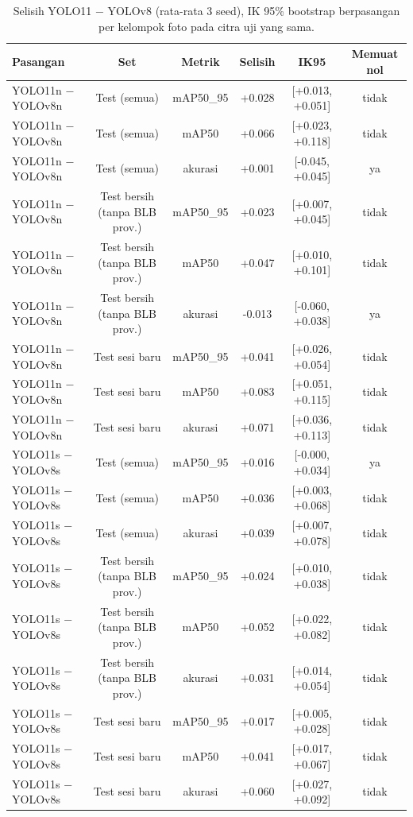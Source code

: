 \begin{table}[!t]
\centering
\caption{Selisih YOLO11 − YOLOv8 (rata-rata 3 seed), IK 95\% bootstrap berpasangan per kelompok foto pada citra uji yang sama.}
\label{tab:v8_vs_v11}
\footnotesize
\begin{tabular}{lccccc}
\hline
\textbf{Pasangan} & \textbf{Set} & \textbf{Metrik} & \textbf{Selisih} & \textbf{IK95} & \textbf{Memuat nol} \\
\hline
YOLO11n − YOLOv8n & Test (semua) & mAP50\_95 & +0.028 & [+0.013, +0.051] & tidak \\
YOLO11n − YOLOv8n & Test (semua) & mAP50 & +0.066 & [+0.023, +0.118] & tidak \\
YOLO11n − YOLOv8n & Test (semua) & akurasi & +0.001 & [-0.045, +0.045] & ya \\
YOLO11n − YOLOv8n & Test bersih (tanpa BLB prov.) & mAP50\_95 & +0.023 & [+0.007, +0.045] & tidak \\
YOLO11n − YOLOv8n & Test bersih (tanpa BLB prov.) & mAP50 & +0.047 & [+0.010, +0.101] & tidak \\
YOLO11n − YOLOv8n & Test bersih (tanpa BLB prov.) & akurasi & -0.013 & [-0.060, +0.038] & ya \\
YOLO11n − YOLOv8n & Test sesi baru & mAP50\_95 & +0.041 & [+0.026, +0.054] & tidak \\
YOLO11n − YOLOv8n & Test sesi baru & mAP50 & +0.083 & [+0.051, +0.115] & tidak \\
YOLO11n − YOLOv8n & Test sesi baru & akurasi & +0.071 & [+0.036, +0.113] & tidak \\
YOLO11s − YOLOv8s & Test (semua) & mAP50\_95 & +0.016 & [-0.000, +0.034] & ya \\
YOLO11s − YOLOv8s & Test (semua) & mAP50 & +0.036 & [+0.003, +0.068] & tidak \\
YOLO11s − YOLOv8s & Test (semua) & akurasi & +0.039 & [+0.007, +0.078] & tidak \\
YOLO11s − YOLOv8s & Test bersih (tanpa BLB prov.) & mAP50\_95 & +0.024 & [+0.010, +0.038] & tidak \\
YOLO11s − YOLOv8s & Test bersih (tanpa BLB prov.) & mAP50 & +0.052 & [+0.022, +0.082] & tidak \\
YOLO11s − YOLOv8s & Test bersih (tanpa BLB prov.) & akurasi & +0.031 & [+0.014, +0.054] & tidak \\
YOLO11s − YOLOv8s & Test sesi baru & mAP50\_95 & +0.017 & [+0.005, +0.028] & tidak \\
YOLO11s − YOLOv8s & Test sesi baru & mAP50 & +0.041 & [+0.017, +0.067] & tidak \\
YOLO11s − YOLOv8s & Test sesi baru & akurasi & +0.060 & [+0.027, +0.092] & tidak \\
\hline
\end{tabular}
\end{table}
